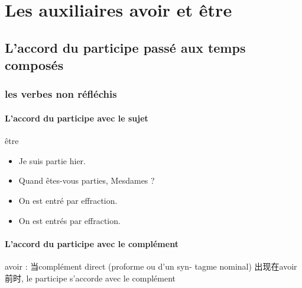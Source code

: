 \documentclass[UTF8]{report}
\begin{document}
\section{Les auxiliaires avoir et être}

\subsection{L’accord du participe passé aux temps composés}

\subsubsection{les verbes non réfléchis}
\paragraph{L’accord du participe avec le sujet}
être
\begin{itemize}
    \item Je suis partie hier.
    \item Quand êtes-vous parties, Mesdames ?
    \item On est entré par effraction.
    \item On est entrés par effraction.
\end{itemize}

\paragraph{L’accord du participe avec le complément}
avoir : 当complément direct (proforme ou d’un syn- tagme nominal) 出现在avoir前时, le participe s’accorde avec le complément
\end{document}
